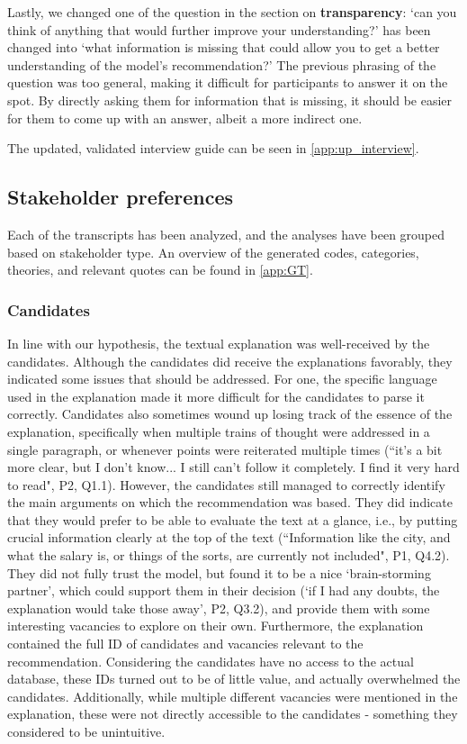 Lastly, we changed one of the question in the section on \textbf{transparency}: `can you think of anything that would further improve your understanding?' has been changed into `what information is missing that could allow you to get a better understanding of the model's recommendation?' The previous phrasing of the question was too general, making it difficult for participants to answer it on the spot. By directly asking them for information that is missing, it should be easier for them to come up with an answer, albeit a more indirect one. 


The updated, validated interview guide can be seen in \cref{app:up_interview}.

\subsection{Stakeholder preferences}
Each of the transcripts has been analyzed, and the analyses have been grouped based on stakeholder type. An overview of the generated codes, categories, theories, and relevant quotes can be found in \cref{app:GT}.

\subsubsection{Candidates}
In line with our hypothesis, the textual explanation was well-received by the candidates. Although the candidates did receive the explanations favorably, they indicated some issues that should be addressed. For one, the specific language used in the explanation made it more difficult for the candidates to parse it correctly. Candidates also sometimes wound up losing track of the essence of the explanation, specifically when multiple trains of thought were addressed in a single paragraph, or whenever points were reiterated multiple times (``it's a bit more clear, but I don't know... I still can't follow it completely. I find it very hard to read", P2, Q1.1). However, the candidates still managed to correctly identify the main arguments on which the recommendation was based. They did indicate that they would prefer to be able to evaluate the text at a glance, i.e., by putting crucial information clearly at the top of the text (``Information like the city, and what the salary is, or things of the sorts, are currently not included", P1, Q4.2). They did not fully trust the model, but found it to be a nice `brain-storming partner', which could support them in their decision (`if I had any doubts, the explanation would take those away', P2, Q3.2), and provide them with some interesting vacancies to explore on their own. Furthermore, the explanation contained the full ID of candidates and vacancies relevant to the recommendation. Considering the candidates have no access to the actual database, these IDs turned out to be of little value, and actually overwhelmed the candidates. Additionally, while multiple different vacancies were mentioned in the explanation, these were not directly accessible to the candidates - something they considered to be unintuitive. 

